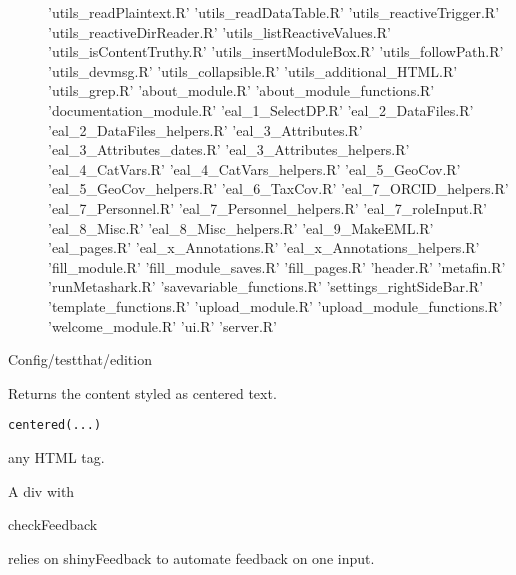 \documentclass[letterpaper]{book}
\begin{document}
\begin{description}
{'utils\_readPlaintext.R' 'utils\_readDataTable.R'
'utils\_reactiveTrigger.R' 'utils\_reactiveDirReader.R'
'utils\_listReactiveValues.R' 'utils\_isContentTruthy.R'
'utils\_insertModuleBox.R' 'utils\_followPath.R' 'utils\_devmsg.R'
'utils\_collapsible.R' 'utils\_additional\_HTML.R' 'utils\_grep.R'
'about\_module.R' 'about\_module\_functions.R'
'documentation\_module.R' 'eal\_1\_SelectDP.R' 'eal\_2\_DataFiles.R'
'eal\_2\_DataFiles\_helpers.R' 'eal\_3\_Attributes.R'
'eal\_3\_Attributes\_dates.R' 'eal\_3\_Attributes\_helpers.R'
'eal\_4\_CatVars.R' 'eal\_4\_CatVars\_helpers.R' 'eal\_5\_GeoCov.R'
'eal\_5\_GeoCov\_helpers.R' 'eal\_6\_TaxCov.R'
'eal\_7\_ORCID\_helpers.R' 'eal\_7\_Personnel.R'
'eal\_7\_Personnel\_helpers.R' 'eal\_7\_roleInput.R' 'eal\_8\_Misc.R'
'eal\_8\_Misc\_helpers.R' 'eal\_9\_MakeEML.R' 'eal\_pages.R'
'eal\_x\_Annotations.R' 'eal\_x\_Annotations\_helpers.R'
'fill\_module.R' 'fill\_module\_saves.R' 'fill\_pages.R' 'header.R'
'metafin.R' 'runMetashark.R' 'savevariable\_functions.R'
'settings\_rightSideBar.R' 'template\_functions.R'
'upload\_module.R' 'upload\_module\_functions.R'
'welcome\_module.R' 'ui.R' 'server.R'}
\item[Config/testthat/edition]
\end{description}
%
\begin{Description}\relax
Returns the content styled as centered text.
\end{Description}
%
\begin{Usage}
\begin{verbatim}
centered(...)
\end{verbatim}
\end{Usage}
%
\begin{Arguments}
\begin{ldescription}
\item[\code{...}] any HTML tag.
\end{ldescription}
\end{Arguments}
%
\begin{Value}
A div with 
\end{Value}
%
\begin{Description}\relax
checkFeedback

relies on shinyFeedback to automate feedback on one input.
\end{Description}
\end{document}
